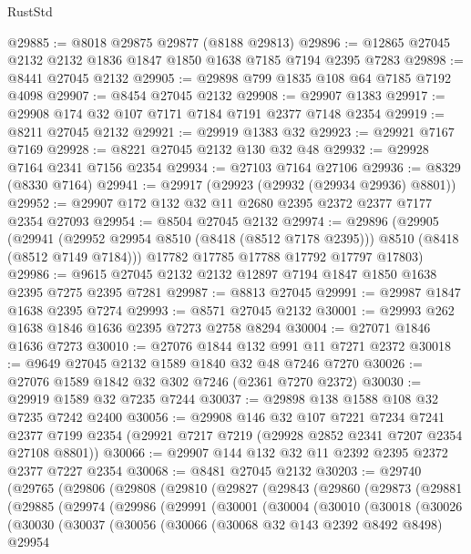\begin{lexlean}{RustStd}
\begin{coremodule}
@29885 := @8018 @29875 @29877 (@8188 @29813)
@29896 := @12865 @27045 @2132 @2132 @1836 @1847 @1850 @1638 @7185 @7194 @2395 @7283
@29898 := @8441 @27045 @2132
@29905 := @29898 @799 @1835 @108 @64 @7185 @7192 @4098
@29907 := @8454 @27045 @2132
@29908 := @29907 @1383
@29917 := @29908 @174 @32 @107 @7171 @7184 @7191 @2377 @7148 @2354
@29919 := @8211 @27045 @2132
@29921 := @29919 @1383 @32
@29923 := @29921 @7167 @7169
@29928 := @8221 @27045 @2132 @130 @32 @48
@29932 := @29928 @7164 @2341 @7156 @2354
@29934 := @27103 @7164 @27106
@29936 := @8329 (@8330 @7164)
@29941 := @29917 (@29923 (@29932 (@29934 @29936) @8801))
@29952 := @29907 @172 @132 @32 @11 @2680 @2395 @2372 @2377 @7177 @2354 @27093
@29954 := @8504 @27045 @2132
@29974 := @29896
    (@29905
      (@29941 (@29952 @29954 @8510 (@8418 (@8512 @7178 @2395))) @8510 (@8418 (@8512 @7149 @7184)))
      @17782
      @17785
      @17788
      @17792
      @17797
      @17803)
@29986 := @9615 @27045 @2132 @2132 @12897 @7194 @1847 @1850 @1638 @2395 @7275 @2395 @7281
@29987 := @8813 @27045
@29991 := @29987 @1847 @1638 @2395 @7274
@29993 := @8571 @27045 @2132
@30001 := @29993 @262 @1638 @1846 @1636 @2395 @7273 @2758 @8294
@30004 := @27071 @1846 @1636 @7273
@30010 := @27076 @1844 @132 @991 @11 @7271 @2372
@30018 := @9649 @27045 @2132 @1589 @1840 @32 @48 @7246 @7270
@30026 := @27076 @1589 @1842 @32 @302 @7246 (@2361 @7270 @2372)
@30030 := @29919 @1589 @32 @7235 @7244
@30037 := @29898 @138 @1588 @108 @32 @7235 @7242 @2400
@30056 := @29908
    @146
    @32
    @107
    @7221
    @7234
    @7241
    @2377
    @7199
    @2354
    (@29921 @7217 @7219 (@29928 @2852 @2341 @7207 @2354 @27108 @8801))
@30066 := @29907 @144 @132 @32 @11 @2392 @2395 @2372 @2377 @7227 @2354
@30068 := @8481 @27045 @2132
@30203 := @29740
    (@29765
      (@29806
        (@29808
          (@29810
            (@29827
              (@29843
                (@29860
                  (@29873
                    (@29881
                      (@29885
                        (@29974
                          (@29986
                            (@29991
                              (@30001
                                (@30004
                                  (@30010
                                    (@30018
                                      (@30026
                                        (@30030
                                          (@30037
                                            (@30056
                                              (@30066
                                                (@30068 @32 @143 @2392 @8492 @8498)
                                                @29954

\end{coremodule}
\end{lexlean}
